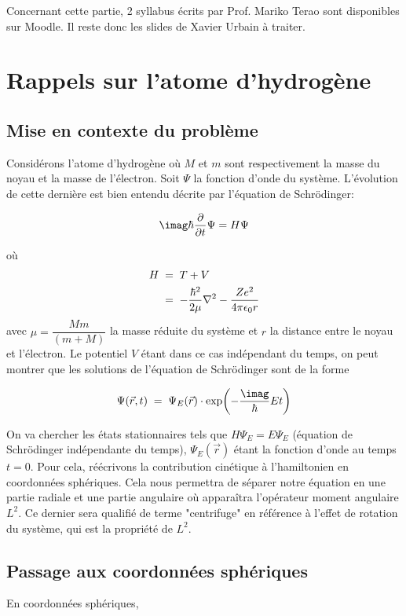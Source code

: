 Concernant cette partie, 2 syllabus écrits par Prof. Mariko Terao sont disponibles sur Moodle. Il reste donc les slides de Xavier Urbain à traiter.

\section{Rappels sur l'atome d'hydrogène}

\subsection{Mise en contexte du problème}

Considérons l'atome d'hydrogène où $M$ et $m$ sont respectivement la masse du noyau et la masse de l'électron. Soit $\Psi$ la fonction d'onde du système. L'évolution de cette dernière est bien entendu décrite par l'équation de Schrödinger:

\[\imag\hbar \dfrac{\partial}{\partial t}\Psi=H\Psi\]

où \begin{align}
H&\; = \; T+V \\
&\; = \; -\dfrac{\hbar^2}{2\mu}\nabla^2-\dfrac{Ze^2}{4\pi \epsilon_0 r}
\end{align}
avec $\mu=\dfrac{Mm}{(m+M)}$ la masse réduite du système et $r$ la distance entre le noyau et l'électron. Le potentiel $V$ étant dans ce cas indépendant du temps, on peut montrer que les solutions de l'équation de Schrödinger sont de la forme

\[
    \Psi(\Vec{r},t) \eq \Psi_E(\Vec{r}) \cdot \exp(-\dfrac{\imag}{\hbar}Et)
\]


On va chercher les états stationnaires tels que $H\Psi_E=E\Psi_E$ (équation de Schrödinger indépendante du temps), $\Psi_E(\Vec{r})$ étant la fonction d'onde au temps $t=0$. Pour cela, réécrivons la contribution cinétique à l'hamiltonien en coordonnées sphériques. Cela nous permettra de séparer notre équation en une partie radiale et une partie angulaire où apparaîtra l'opérateur moment angulaire $L^2$. Ce dernier sera qualifié de terme "centrifuge" en référence à l'effet de rotation du système, qui est la propriété de $L^2$.

\subsection{Passage aux coordonnées sphériques}

En coordonnées sphériques,

